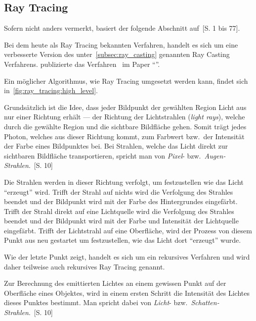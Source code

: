 \subsection{Ray Tracing}
\label{subsec:ray_tracing}

Sofern nicht anders vermerkt, basiert der folgende Abschnitt
auf~\cite{glassner_introduction_1989}[S. 1 bis 77].

Bei dem heute als Ray Tracing bekannten Verfahren, handelt es sich um
eine verbesserte Version des unter~\ref{subsec:ray_casting} genannten
Ray Casting Verfahrens. \citeauthor{whitted_improved_1980} publizierte
das Verfahren~\citeyear{whitted_improved_1980} im Paper
``''.

Ein möglicher Algorithmus, wie Ray Tracing umgesetzt werden kann,
findet sich in~\ref{fig:ray_tracing:high_level}.

Grundsätzlich ist die Idee, dass jeder Bildpunkt der gewählten Region
Licht aus nur einer Richtung erhält --- der Richtung der Lichtstrahlen
(\textit{light rays}), welche durch die gewählte Region und die
sichtbare Bildfläche gehen. Somit trägt jedes Photon, welches aus dieser
Richtung kommt, zum Farbwert bzw.\ der Intensität der Farbe eines
Bildpunktes bei. Bei Strahlen, welche das Licht direkt zur sichtbaren
Bildfläche transportieren, spricht man von \textit{Pixel}- bzw.\
\textit{Augen-Strahlen}.~\cite{glassner_introduction_1989}[S. 10]


Die Strahlen werden in dieser Richtung verfolgt, um festzustellen wie
das Licht ``erzeugt'' wird. Trifft der Strahl auf nichts wird die
Verfolgung des Strahles beendet und der Bildpunkt wird mit der Farbe des
Hintergrundes eingefärbt. Trifft der Strahl direkt auf eine Lichtquelle
wird die Verfolgung des Strahles beendet und der Bildpunkt wird mit der
Farbe und Intensität der Lichtquelle eingefärbt.  Trifft der Lichtstrahl
auf eine Oberfläche, wird der Prozess von diesem Punkt aus neu gestartet
um festzustellen, wie das Licht dort ``erzeugt'' wurde. 

Wie der letzte Punkt zeigt, handelt es sich um ein rekursives Verfahren
und wird daher teilweise auch rekursives Ray Tracing genannt.

Zur Berechnung des emittierten Lichtes an einem gewissen Punkt auf der
Oberfläche eines Objektes, wird in einem ersten Schritt die Intensität
des Lichtes dieses Punktes bestimmt. Man spricht dabei von \textit{Licht}- bzw.\
\textit{Schatten-Strahlen}.~\cite{glassner_introduction_1989}[S. 10]

